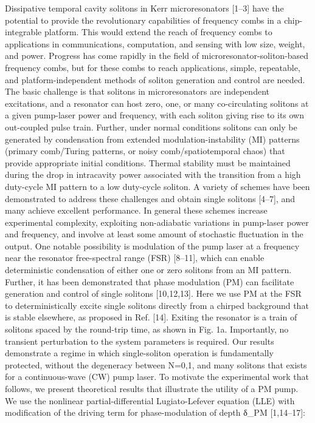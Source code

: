 Dissipative temporal cavity solitons in Kerr microresonators [1–3] have the potential to provide the revolutionary capabilities of frequency combs in a chip-integrable platform. This would extend the reach of frequency combs to applications in communications,  computation, and sensing with low size, weight, and power. Progress has come rapidly in the field of microresonator-soliton-based frequency combs, but for these combs to reach applications, simple, repeatable, and platform-independent methods of soliton generation and control are needed. The basic challenge is that solitons in microresonators are independent excitations, and a resonator can host zero, one, or many co-circulating solitons at a given pump-laser power and frequency, with each soliton giving rise to its own out-coupled pulse train. Further, under normal conditions solitons can only be generated by condensation from extended modulation-instability (MI) patterns (primary comb/Turing patterns, or noisy comb/spatiotemporal chaos) that provide appropriate initial conditions. Thermal stability must be maintained during the drop in intracavity power associated with the transition from a high duty-cycle MI pattern to a low duty-cycle soliton. A variety of schemes have been demonstrated to address these challenges and obtain single solitons [4–7], and many achieve excellent performance. In general these schemes increase experimental complexity, exploiting non-adiabatic variations in pump-laser power and frequency, and involve at least some amount of stochastic fluctuation in the output. 
One notable possibility is modulation of the pump laser at a frequency near the resonator free-spectral range (FSR) [8–11], which can enable deterministic condensation of either one or zero solitons from an MI pattern. Further, it has been demonstrated that phase modulation (PM) can facilitate generation and control of single solitons [10,12,13]. Here we use PM at the FSR to deterministically excite single solitons directly from a chirped background that is stable elsewhere, as proposed in Ref.  [14]. Exiting the resonator is a train of solitons spaced by the round-trip time, as shown in Fig. 1a.  Importantly, no transient perturbation to the system parameters is required.
Our results demonstrate a regime in which single-soliton operation is fundamentally protected, without the degeneracy between N=0,1, and many solitons that exists for a continuous-wave (CW) pump laser.  To motivate the experimental work that follows, we present theoretical results that illustrate the utility of a PM pump. We use the nonlinear partial-differential Lugiato-Lefever equation (LLE) with modification of the driving term for phase-modulation of depth δ_PM [1,14–17]:


